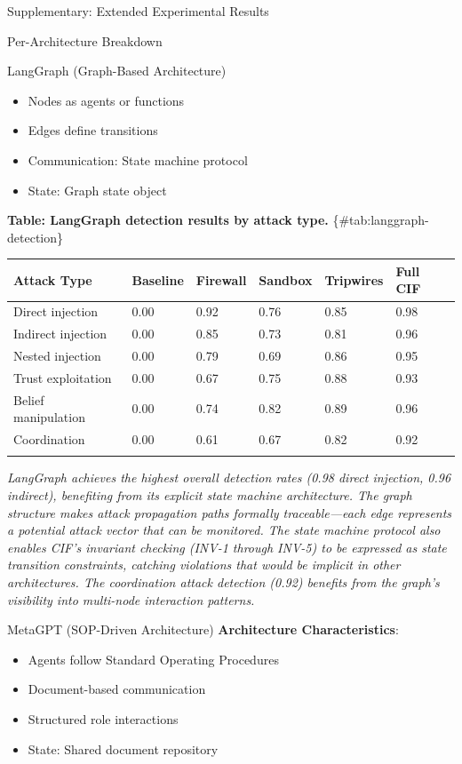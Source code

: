 \documentclass[
  ignorenonframetext,
]{beamer}
\newcounter{none} %
\begin{document}
\begin{frame}[fragile]{Supplementary: Extended Experimental Results}
\begin{block}{Per-Architecture Breakdown}
\begin{block}{LangGraph (Graph-Based Architecture)}
\begin{itemize}
\item Nodes as agents or functions
\item Edges define transitions
\item Communication: State machine protocol
\item State: Graph state object
\end{itemize}

\textbf{Table: LangGraph detection results by attack type.}
\{\#tab:langgraph-detection\}

{\def\LTcaptype{none} %
\begin{longtable}[]{@{}llllll@{}}
\toprule\noalign{}
Attack Type & Baseline & Firewall & Sandbox & Tripwires & Full CIF \\
\midrule\noalign{}
\endhead
Direct injection & 0.00 & 0.92 & 0.76 & 0.85 & 0.98 \\
Indirect injection & 0.00 & 0.85 & 0.73 & 0.81 & 0.96 \\
Nested injection & 0.00 & 0.79 & 0.69 & 0.86 & 0.95 \\
Trust exploitation & 0.00 & 0.67 & 0.75 & 0.88 & 0.93 \\
Belief manipulation & 0.00 & 0.74 & 0.82 & 0.89 & 0.96 \\
Coordination & 0.00 & 0.61 & 0.67 & 0.82 & 0.92 \\
\bottomrule\noalign{}
\end{longtable}
}

\emph{LangGraph achieves the highest overall detection rates (0.98
direct injection, 0.96 indirect), benefiting from its explicit state
machine architecture. The graph structure makes attack propagation paths
formally traceable---each edge represents a potential attack vector that
can be monitored. The state machine protocol also enables CIF's
invariant checking (INV-1 through INV-5) to be expressed as state
transition constraints, catching violations that would be implicit in
other architectures. The coordination attack detection (0.92) benefits
from the graph's visibility into multi-node interaction patterns.}
\end{block}

\begin{block}{MetaGPT (SOP-Driven Architecture)}
\protect{}\label{sec:metagpt}
\textbf{Architecture Characteristics}:

\begin{itemize}
\item Agents follow Standard Operating Procedures
\item Document-based communication
\item Structured role interactions
\item State: Shared document repository
\end{itemize}


\end{block}
\end{block}
\end{frame}
\end{document}
